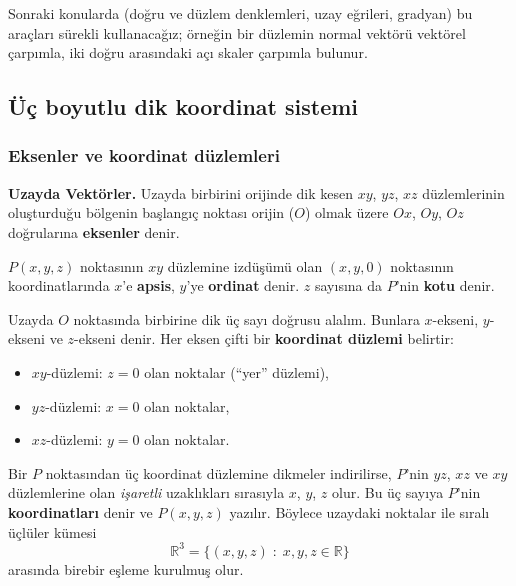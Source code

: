 Sonraki konularda (doğru ve düzlem denklemleri, uzay eğrileri, gradyan) bu araçları sürekli kullanacağız; örneğin bir düzlemin normal vektörü vektörel çarpımla, iki doğru arasındaki açı skaler çarpımla bulunur.

\subsection{Üç boyutlu dik koordinat sistemi}

\subsubsection{Eksenler ve koordinat düzlemleri}

\begin{tahta}
\textbf{Uzayda Vektörler.} Uzayda birbirini orijinde dik kesen $xy$, $yz$, $xz$ düzlemlerinin oluşturduğu bölgenin başlangıç noktası orijin ($O$) olmak üzere $Ox$, $Oy$, $Oz$ doğrularına \textbf{eksenler} denir.

$P(x,y,z)$ noktasının $xy$ düzlemine izdüşümü olan $(x,y,0)$ noktasının koordinatlarında $x$'e \textbf{apsis}, $y$'ye \textbf{ordinat} denir. $z$ sayısına da $P$'nin \textbf{kotu} denir.
\end{tahta}

Uzayda $O$ noktasında birbirine dik üç sayı doğrusu alalım. Bunlara $x$-ekseni, $y$-ekseni ve $z$-ekseni denir. Her eksen çifti bir \textbf{koordinat düzlemi} belirtir:
\begin{itemize}
\item $xy$-düzlemi: $z=0$ olan noktalar (``yer'' düzlemi),
\item $yz$-düzlemi: $x=0$ olan noktalar,
\item $xz$-düzlemi: $y=0$ olan noktalar.
\end{itemize}

Bir $P$ noktasından üç koordinat düzlemine dikmeler indirilirse, $P$'nin $yz$, $xz$ ve $xy$ düzlemlerine olan \emph{işaretli} uzaklıkları sırasıyla $x$, $y$, $z$ olur. Bu üç sayıya $P$'nin \textbf{koordinatları} denir ve $P(x,y,z)$ yazılır. Böylece uzaydaki noktalar ile sıralı üçlüler kümesi
\[
\mathbb{R}^3=\{(x,y,z)\;:\;x,y,z\in\mathbb{R}\}
\]
arasında birebir eşleme kurulmuş olur.

